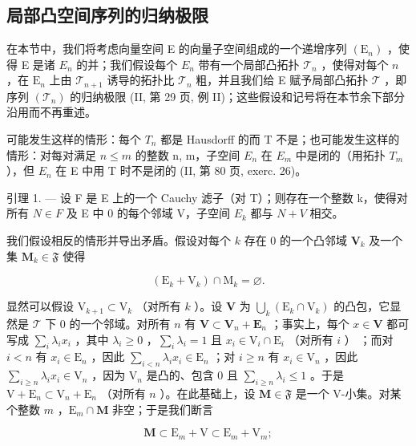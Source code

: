 \subsection{局部凸空间序列的归纳极限}

在本节中，我们将考虑向量空间 E 的向量子空间组成的一个递增序列 \((\mathrm{E}_{n})\) ，使得 E 是诸 \(E_{n}\) 的并；我们假设每个 \(E_{n}\) 带有一个局部凸拓扑 \(\mathcal{T}_n\) ，使得对每个 \(n\) ，在 \(\mathrm{E}_n\) 上由 \(\mathcal{T}_{n+1}\) 诱导的拓扑比 \(\mathcal{T}_n\) 粗，并且我们给 E 赋予局部凸拓扑 \(\mathcal{T}\) ，即序列 \((\mathcal{T}_n)\) 的归纳极限 (II, 第 29 页, 例 II)；这些假设和记号将在本节余下部分沿用而不再重述。

可能发生这样的情形：每个 \(T_{n}\) 都是 Hausdorff 的而 T 不是；也可能发生这样的情形：对每对满足 \(n \leqslant m\) 的整数 n, m，子空间 \(E_{n}\) 在 \(E_{m}\) 中是闭的（用拓扑 \(T_{m}\) ），但 \(E_{n}\) 在 E 中用 T 时不是闭的 (II, 第 80 页, exerc. 26)。

引理 1. --- 设 F 是 E 上的一个 Cauchy 滤子（对 T）；则存在一个整数 k，使得对所有 \(N \in F\) 及 E 中 0 的每个邻域 V，子空间 \(E_{k}\) 都与 \(N + V\) 相交。

我们假设相反的情形并导出矛盾。假设对每个 \(k\) 存在 0 的一个凸邻域 \(\mathbf{V}_k\) 及一个集 \(\mathbf{M}_k \in \mathfrak{F}\) 使得

\[
\left(\mathrm{E} _ {k} + \mathrm{V} _ {k}\right) \cap \mathrm{M} _ {k} = \varnothing .
\]

显然可以假设 \(\mathrm{V}_{k + 1} \subset \mathrm{V}_k\) （对所有 \(k\) ）。设 \(\mathbf{V}\) 为 \(\bigcup_{k} (\mathrm{E}_k \cap \mathrm{V}_k)\) 的凸包，它显然是 \(\mathcal{T}\) 下 0 的一个邻域。对所有 \(n\) 有 \(\mathbf{V} \subset \mathbf{V}_n + \mathbf{E}_n\) ；事实上，每个 \(x \in \mathbf{V}\) 都可写成 \(\sum_{i} \lambda_i x_i\) ，其中 \(\lambda_i \geqslant 0\) ，\(\sum_{i} \lambda_i = 1\) 且 \(x_i \in \mathrm{V}_i \cap \mathrm{E}_i\) （对所有 \(i\) ） ；而对 \(i < n\) 有 \(x_i \in \mathrm{E}_n\) ，因此 \(\sum_{i < n} \lambda_i x_i \in \mathrm{E}_n\) ；对 \(i \geqslant n\) 有 \(x_i \in \mathrm{V}_n\) ，因此 \(\sum_{i \geqslant n} \lambda_i x_i \in \mathrm{V}_n\) ，因为 \(\mathrm{V}_n\) 是凸的、包含 0 且 \(\sum_{i \geqslant n} \lambda_i \leqslant 1\) 。于是 \(\mathrm{V} + \mathrm{E}_n \subset \mathrm{V}_n + \mathrm{E}_n\) （对所有 \(n\) ）。在此基础上，设 \(\mathbf{M} \in \mathfrak{F}\) 是一个 V-小集。对某个整数 \(m\) ，\(\mathrm{E}_m \cap \mathbf{M}\) 非空；于是我们断言

\[
\mathbf {M} \subset \mathrm{E} _ {m} + \mathrm{V} \subset \mathrm{E} _ {m} + \mathrm{V} _ {m};
\]

